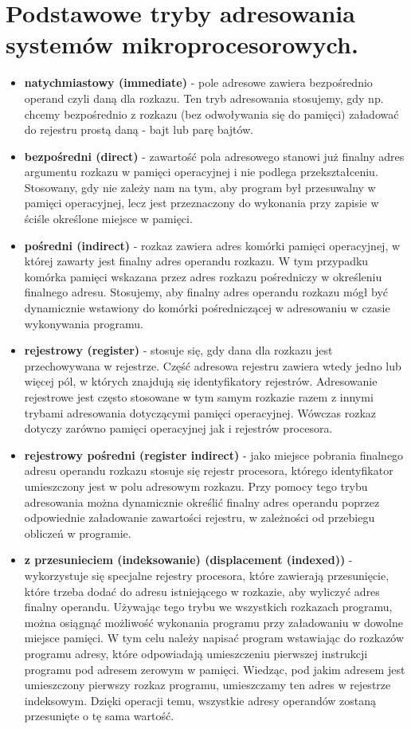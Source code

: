 \documentclass[12pt,a4paper]{article}
\begin{document}
	\section{Podstawowe tryby adresowania systemów mikroprocesorowych.}
	\begin{itemize}
		\item \textbf{natychmiastowy (immediate)} - pole adresowe zawiera bezpośrednio operand czyli daną dla rozkazu. Ten tryb adresowania stosujemy, gdy np. chcemy bezpośrednio z rozkazu (bez odwoływania się do pamięci) załadować do rejestru prostą daną - bajt lub parę bajtów.
		\item \textbf{bezpośredni (direct)} - zawartość pola adresowego stanowi już finalny adres argumentu rozkazu w pamięci operacyjnej i nie podlega przekształceniu. Stosowany, gdy nie zależy nam na tym, aby program był przesuwalny w pamięci operacyjnej, lecz jest przeznaczony do wykonania przy zapisie w ściśle określone miejsce w pamięci.
		\item \textbf{pośredni (indirect)} - rozkaz zawiera adres komórki pamięci operacyjnej, w której zawarty jest finalny adres operandu rozkazu. W tym przypadku komórka pamięci wskazana przez adres rozkazu pośredniczy w określeniu finalnego adresu. Stosujemy, aby finalny adres operandu rozkazu mógł być dynamicznie wstawiony do komórki pośredniczącej w adresowaniu w czasie wykonywania programu.
		\item \textbf{rejestrowy (register)} - stosuje się, gdy dana dla rozkazu jest przechowywana w rejestrze. Część adresowa rejestru zawiera wtedy jedno lub więcej pól, w których znajdują się identyfikatory rejestrów. Adresowanie rejestrowe jest często stosowane w tym samym rozkazie razem z innymi trybami adresowania dotyczącymi pamięci operacyjnej. Wówczas rozkaz dotyczy zarówno pamięci operacyjnej jak i rejestrów procesora.
		\item \textbf{rejestrowy pośredni (register indirect)} - jako miejsce pobrania finalnego adresu operandu rozkazu stosuje się rejestr procesora, którego identyfikator umieszczony jest w polu adresowym rozkazu. Przy pomocy tego trybu adresowania można dynamicznie określić finalny adres operandu poprzez odpowiednie załadowanie zawartości rejestru, w zależności od przebiegu obliczeń w programie.
		\item \textbf{z przesunieciem (indeksowanie) (displacement (indexed))} - wykorzystuje się specjalne rejestry procesora, które zawierają przesunięcie, które trzeba dodać do adresu istniejącego w rozkazie, aby wyliczyć adres finalny operandu. Używając tego trybu we wszystkich rozkazach programu, można osiągnąć możliwość wykonania programu przy załadowaniu w dowolne miejsce pamięci. W tym celu należy napisać program wstawiając do rozkazów programu adresy, które odpowiadają umieszczeniu pierwszej instrukcji programu pod adresem zerowym w pamięci. Wiedząc, pod jakim adresem jest umieszczony pierwszy rozkaz programu, umieszczamy ten adres w rejestrze indeksowym. Dzięki operacji temu, wszystkie adresy operandów zostaną przesunięte o tę sama wartość.
	\end{itemize}
\end{document}
